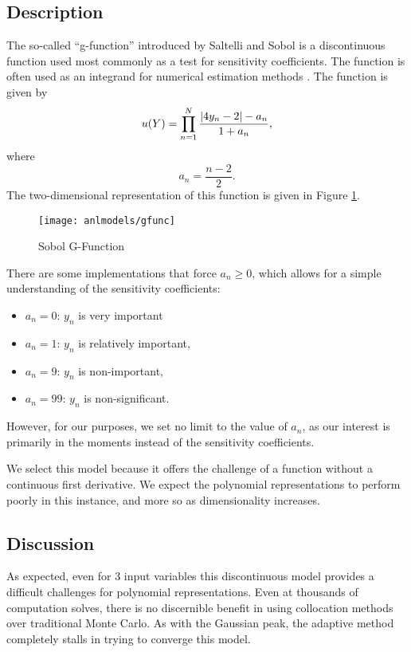 \subsection{Description}
The so-called ``g-function'' introduced by Saltelli and Sobol \cite{gfunc} is a discontinuous
function used most commonly as a test for sensitivity coefficients.  The function is often used as an integrand
for numerical estimation methods \cite{gfuncM}.
The function is given by
\begin{equation}
  u(Y) = \prod_{n=1}^N \frac{\abs{4y_n-2}-a_n}{1+a_n},
\end{equation}
where
\begin{equation}
  a_n = \frac{n-2}{2}.
\end{equation}
The two-dimensional representation of this function is given in Figure \ref{fig: g func}.
\begin{figure}[htb]
  \centering
  \texttt{[image: anlmodels/gfunc]}
  \caption{Sobol G-Function \cite{sfu}}
  \label{fig: g func}
\end{figure}

There are some implementations \cite{gfuncM} that force $a_n \geq 0$, which allows for a simple
understanding of the sensitivity coefficients:
\begin{itemize}
  \item $a_n=0$: $y_n$ is very important
  \item $a_n=1$: $y_n$ is relatively important,
  \item $a_n=9$: $y_n$ is non-important,
  \item $a_n=99$: $y_n$ is non-significant.
\end{itemize}
However, for our purposes, we set no limit to the value of $a_n$, as our interest is primarily in the moments
instead of the sensitivity coefficients.

We select this model because it offers the challenge of a function
without a continuous first derivative.  We expect the polynomial representations to perform poorly
in this instance, and more so as dimensionality increases.

\subsection{Discussion}
As expected, even for 3 input variables this discontinuous model provides a difficult challenges for
polynomial representations.  Even at thousands of computation solves, there is no discernible benefit in using
collocation methods over traditional Monte Carlo.  As with the Gaussian peak, the adaptive method completely
stalls in trying to converge this model.
